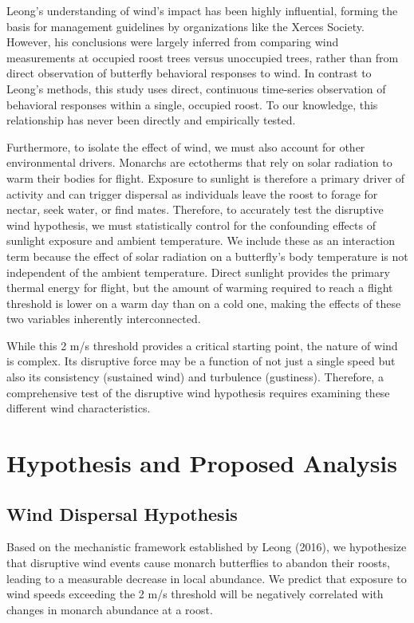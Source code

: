 Leong's understanding of wind's impact has been highly influential, forming the basis for management guidelines by organizations like the Xerces Society. However, his conclusions were largely inferred from comparing wind measurements at occupied roost trees versus unoccupied trees, rather than from direct observation of butterfly behavioral responses to wind. In contrast to Leong's methods, this study uses direct, continuous time-series observation of behavioral responses within a single, occupied roost. To our knowledge, this relationship has never been directly and empirically tested.

Furthermore, to isolate the effect of wind, we must also account for other environmental drivers. Monarchs are ectotherms that rely on solar radiation to warm their bodies for flight. Exposure to sunlight is therefore a primary driver of activity and can trigger dispersal as individuals leave the roost to forage for nectar, seek water, or find mates. Therefore, to accurately test the disruptive wind hypothesis, we must statistically control for the confounding effects of sunlight exposure and ambient temperature. We include these as an interaction term because the effect of solar radiation on a butterfly's body temperature is not independent of the ambient temperature. Direct sunlight provides the primary thermal energy for flight, but the amount of warming required to reach a flight threshold is lower on a warm day than on a cold one, making the effects of these two variables inherently interconnected.

While this 2 m/s threshold provides a critical starting point, the nature of wind is complex. Its disruptive force may be a function of not just a single speed but also its consistency (sustained wind) and turbulence (gustiness). Therefore, a comprehensive test of the disruptive wind hypothesis requires examining these different wind characteristics.

\section{Hypothesis and Proposed Analysis}

\subsection{Wind Dispersal Hypothesis}

Based on the mechanistic framework established by Leong (2016), we hypothesize that disruptive wind events cause monarch butterflies to abandon their roosts, leading to a measurable decrease in local abundance. We predict that exposure to wind speeds exceeding the 2 m/s threshold will be negatively correlated with changes in monarch abundance at a roost.


